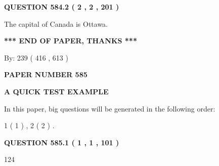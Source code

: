 \documentclass[12pt]{article}
\begin{document}
{\textbf{\Large{QUESTION
584.2 
 ( 2 , 2 , 201 )
}}}
  
  
 
 
\noindent{}
 
 
The capital of Canada is Ottawa.
 
 
 
 
   
   
 \vspace{0.2in}
 
   
   
   
   
\vspace{1.0in} 
{\textbf{\large{ *** END OF PAPER, THANKS *** }}} 
   
   
\hspace{1.0in} By: 
 239 ( 416 ,  613 )
   
   
   
   
\newpage 
\setcounter{page}{ 
   585001 } 
   
   
   
   
 {\textbf{ \Large{ PAPER NUMBER  585  }}}
   
   
\vspace{0.2in}
   
   
   
   
   
   
 \vspace{0.2in}
{\LARGE {\textbf{ A QUICK TEST EXAMPLE}}}
   
   
   
\vspace{0.2in}
   
In this paper, big questions will be generated in the following order: 
   
   
   1 ( 1 )
 ,
   2 ( 2 )
 .
  
\vspace{0.2in}
  
{\textbf{\Large{QUESTION
585.1 
 ( 1 , 1 , 101 )
}}}
  
  
 
 
\noindent{}

124
 
 
 
 
\noindent{}
\end{document}
